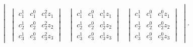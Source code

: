 \documentclass{toc}
\begin{document}
\begin{example}
\[\begin{vmatrix*}
      \\
      \begin{vmatrix*}
        c_1^1 & c_1^0 & c_1^2 z_1 \\
        c_2^1 & c_2^0 & c_2^2 z_2 \\
        c_3^1 & c_3^0 & c_3^2 z_3 
      \end{vmatrix*}
      &
      \begin{vmatrix*}
        c_1^1 & c_1^0 & c_1^1 z_1 \\
        c_2^1 & c_2^0 & c_2^1 z_2 \\
        c_3^1 & c_3^0 & c_3^1 z_3 
      \end{vmatrix*}
      &
      \begin{vmatrix*}
        c_1^1 & c_1^0 & c_1^0 z_1 \\
        c_2^1 & c_2^0 & c_2^0 z_2 \\
        c_3^1 & c_3^0 & c_3^0 z_3 
      \end{vmatrix*}
    \end{vmatrix*}.
  \]
  \endgroup
\end{example}
\end{document}
